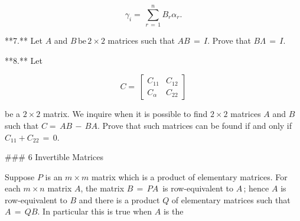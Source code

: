 \[\gamma_{i}=\,\sum_{r\,=\,1}^{n}B_{r}\alpha_{r}.\]

**7.** Let \(A\) and \(B\,\mbox{be}\,2\times 2\) matrices such that \(AB\,=\,I\). Prove that \(B\Lambda\,=\,I\).

**8.** Let

\[C=\,\begin{bmatrix}C_{11}&C_{12}\\ C_{\alpha}&C_{22}\end{bmatrix}\]

be a \(2\times 2\) matrix. We inquire when it is possible to find \(2\times 2\) matrices \(A\) and \(B\) such that \(C=\,AB\,-\,BA\). Prove that such matrices can be found if and only if \(C_{11}+C_{22}\,=\,0\).

### 6 Invertible Matrices

Suppose \(P\) is an \(m\times m\) matrix which is a product of elementary matrices. For each \(m\times n\) matrix \(A\), the matrix \(B\,=\,PA\,\) is row-equivalent to \(A\,\); hence \(A\) is row-equivalent to \(B\) and there is a product \(Q\) of elementary matrices such that \(A\,=\,QB\). In particular this is true when \(A\) is the 